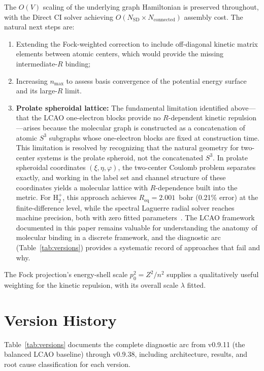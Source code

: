 \documentclass[aps,pra,twocolumn,superscriptaddress,longbibliography]{revtex4-2}
\begin{document}
The $O(V)$ scaling of the underlying graph Hamiltonian is preserved
throughout, with the Direct CI solver achieving
$O(N_{\mathrm{SD}}\times N_{\mathrm{connected}})$ assembly cost.
The natural next steps are:
\begin{enumerate}
\item Extending the Fock-weighted correction to include off-diagonal
kinetic matrix elements between atomic centers, which would provide
the missing intermediate-$R$ binding;
\item Increasing $n_{\max}$ to assess basis convergence of the
potential energy surface and its large-$R$ limit.
\item \textbf{Prolate spheroidal lattice:} The fundamental limitation
identified above---that the LCAO one-electron blocks provide no
$R$-dependent kinetic repulsion---arises because the molecular graph
is constructed as a concatenation of atomic $S^3$ subgraphs whose
one-electron blocks are fixed at construction time.  This limitation
is resolved by recognizing that the natural geometry for two-center
systems is the prolate spheroid, not the concatenated $S^3$.  In
prolate spheroidal coordinates $(\xi, \eta, \varphi)$, the two-center
Coulomb problem separates exactly, and working in the label set and
channel structure of these coordinates yields a molecular lattice
with $R$-dependence built into the metric.  For H$_2^+$, this approach
achieves $R_{\mathrm{eq}} = 2.001$~bohr (0.21\% error) at the
finite-difference level, while the spectral Laguerre radial solver
reaches machine precision, both with zero fitted
parameters~\cite{loutey_paper11}.  The LCAO framework documented in
this paper remains valuable for understanding the anatomy of molecular
binding in a discrete framework, and the diagnostic arc
(Table~\ref{tab:versions}) provides a systematic record of approaches
that fail and why.
\end{enumerate}
The Fock projection's energy-shell scale $p_0^2 = Z^2/n^2$ supplies a
qualitatively useful weighting for the kinetic repulsion, with its
overall scale $\lambda$ fitted.

\appendix
\section{Version History}
\label{app:versions}

Table~\ref{tab:versions} documents the complete diagnostic arc from
v0.9.11 (the balanced LCAO baseline) through v0.9.38, including
architecture, results, and root cause classification for each version.
\end{document}
